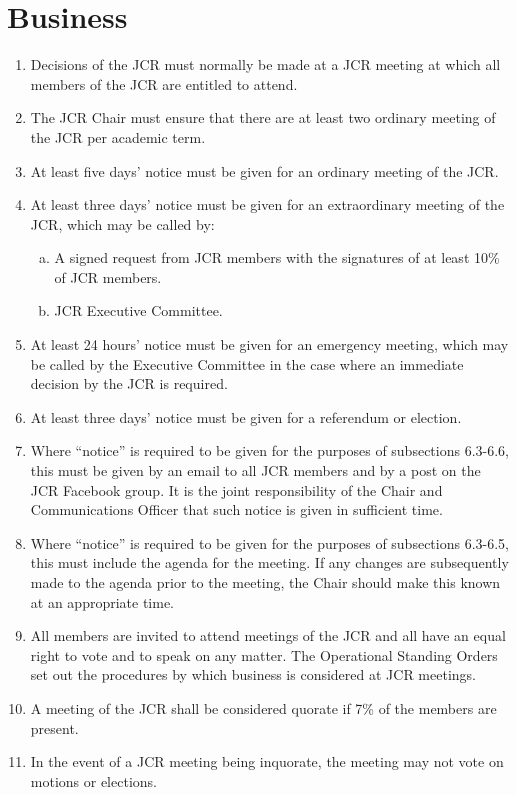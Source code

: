 \documentclass[12pt]{article}  %
\begin{document}
\section{Business}
\begin{enumerate}
    \item Decisions of the JCR must normally be made at a JCR meeting at which all members of the JCR are entitled to attend.
    \item The JCR Chair must ensure that there are at least two ordinary meeting of the JCR per academic term.
    \item At least five days’ notice must be given for an ordinary meeting of the JCR. 
    \item At least three days’ notice must be given for an extraordinary meeting of the JCR, which may be called by:
    \begin{enumerate}[(a)]
        \item A signed request from JCR members with the signatures of at least 10\% of JCR members.
        \item JCR Executive Committee.
    \end{enumerate}
    \item At least 24 hours’ notice must be given for an emergency meeting, which may be called by the Executive Committee in the case where an immediate decision by the JCR is required.
    \item At least three days’ notice must be given for a referendum or election.
    \item Where “notice” is required to be given for the purposes of subsections 6.3-6.6, this must be given by an email to all JCR members and by a post on the JCR Facebook group. It is the joint responsibility of the Chair and Communications Officer that such notice is given in sufficient time.
    \item Where “notice” is required to be given for the purposes of subsections 6.3-6.5, this must include the agenda for the meeting. If any changes are subsequently made to the agenda prior to the meeting, the Chair should make this known at an appropriate time.
    \item All members are invited to attend meetings of the JCR and all have an equal right to vote and to speak on any matter. The Operational Standing Orders set out the procedures by which business is considered at JCR meetings.
    \item A meeting of the JCR shall be considered quorate if 7\% of the members are present.
    \item In the event of a JCR meeting being inquorate, the meeting may not vote on motions or elections.

\end{enumerate}
\end{document}
